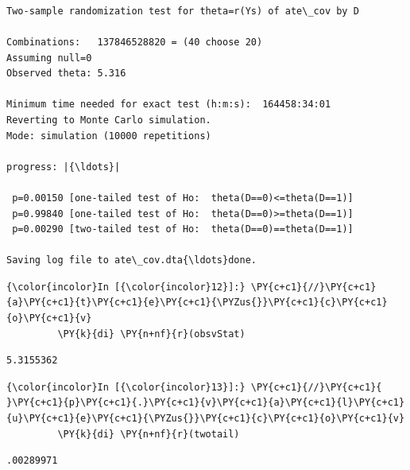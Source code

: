 \documentclass[11pt,notitlepage]{article}\usepackage[]{graphicx}\usepackage[]{color}
\makeatletter
\newenvironment{kframe}{%
 \def\at@end@of@kframe{}%
 \ifinner\ifhmode%
  \def\at@end@of@kframe{\end{minipage}}%
  \begin{minipage}{\columnwidth}%
 \fi\fi%
 \def\FrameCommand##1{\hskip\@totalleftmargin \hskip-\fboxsep
 \colorbox{shadecolor}{##1}\hskip-\fboxsep
     \hskip-\linewidth \hskip-\@totalleftmargin \hskip\columnwidth}%
 \MakeFramed {\advance\hsize-\width
   \@totalleftmargin\z@ \linewidth\hsize
   \@setminipage}}%
 {\par\unskip\endMakeFramed%
 \at@end@of@kframe}
\newenvironment{knitrout}{}{} %
\makeatother
\begin{document}
\begin{enumerate}[a)]
\begin{knitrout}
\begin{kframe}
    \begin{Verbatim}[commandchars=\\\{\}]



Two-sample randomization test for theta=r(Ys) of ate\_cov by D

Combinations:   137846528820 = (40 choose 20)
Assuming null=0
Observed theta: 5.316

Minimum time needed for exact test (h:m:s):  164458:34:01
Reverting to Monte Carlo simulation.
Mode: simulation (10000 repetitions)

progress: |{\ldots}|

 p=0.00150 [one-tailed test of Ho:  theta(D==0)<=theta(D==1)]
 p=0.99840 [one-tailed test of Ho:  theta(D==0)>=theta(D==1)]
 p=0.00290 [two-tailed test of Ho:  theta(D==0)==theta(D==1)]

Saving log file to ate\_cov.dta{\ldots}done.

    \end{Verbatim}

    \begin{Verbatim}[commandchars=\\\{\}]
{\color{incolor}In [{\color{incolor}12}]:} \PY{c+c1}{//}\PY{c+c1}{a}\PY{c+c1}{t}\PY{c+c1}{e}\PY{c+c1}{\PYZus{}}\PY{c+c1}{c}\PY{c+c1}{o}\PY{c+c1}{v}
         \PY{k}{di} \PY{n+nf}{r}(obsvStat)
\end{Verbatim}

    \begin{Verbatim}[commandchars=\\\{\}]
5.3155362

    \end{Verbatim}

    \begin{Verbatim}[commandchars=\\\{\}]
{\color{incolor}In [{\color{incolor}13}]:} \PY{c+c1}{//}\PY{c+c1}{ }\PY{c+c1}{p}\PY{c+c1}{.}\PY{c+c1}{v}\PY{c+c1}{a}\PY{c+c1}{l}\PY{c+c1}{u}\PY{c+c1}{e}\PY{c+c1}{\PYZus{}}\PY{c+c1}{c}\PY{c+c1}{o}\PY{c+c1}{v}
         \PY{k}{di} \PY{n+nf}{r}(twotail)
\end{Verbatim}

    \begin{Verbatim}[commandchars=\\\{\}]
.00289971

    \end{Verbatim}
\end{kframe}
\end{knitrout}


\end{enumerate}
\end{document}
